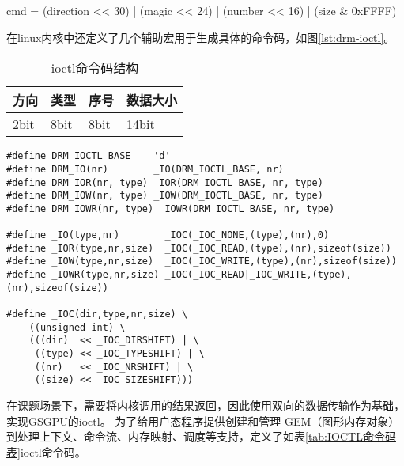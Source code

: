 cmd = (direction << 30) | (magic << 24) | (number << 16) | (size \& 0xFFFF)

在linux内核中还定义了几个辅助宏用于生成具体的命令码，如图\ref{lst:drm-ioctl}。

\begin{table}[h]
  \centering
  \caption{ioctl命令码结构}
  \label{tab:ioctl命令码结构}
  \begin{tabular}{llll}
    \toprule
    方向  & 类型 & 序号 & 数据大小 \\
    \midrule
    2bit & 8bit & 8bit & 14bit \\
    \bottomrule
  \end{tabular}
  \note{}
\end{table}


\begin{lstlisting}[caption={DRM IOCTL宏定义}, label={lst:drm-ioctl}]
#define DRM_IOCTL_BASE    'd'
#define DRM_IO(nr)        _IO(DRM_IOCTL_BASE, nr)
#define DRM_IOR(nr, type) _IOR(DRM_IOCTL_BASE, nr, type)
#define DRM_IOW(nr, type) _IOW(DRM_IOCTL_BASE, nr, type)
#define DRM_IOWR(nr, type) _IOWR(DRM_IOCTL_BASE, nr, type)

#define _IO(type,nr)        _IOC(_IOC_NONE,(type),(nr),0)
#define _IOR(type,nr,size)  _IOC(_IOC_READ,(type),(nr),sizeof(size))
#define _IOW(type,nr,size)  _IOC(_IOC_WRITE,(type),(nr),sizeof(size))
#define _IOWR(type,nr,size) _IOC(_IOC_READ|_IOC_WRITE,(type),(nr),sizeof(size))

#define _IOC(dir,type,nr,size) \
    ((unsigned int) \
    (((dir)  << _IOC_DIRSHIFT) | \
     ((type) << _IOC_TYPESHIFT) | \
     ((nr)   << _IOC_NRSHIFT) | \
     ((size) << _IOC_SIZESHIFT)))
\end{lstlisting}


在课题场景下，需要将内核调用的结果返回，因此使用双向的数据传输作为基础，实现GSGPU的ioctl。
为了给用户态程序提供创建和管理 GEM（图形内存对象）到处理上下文、命令流、内存映射、调度等支持，定义了如表\ref{tab:IOCTL命令码表}ioctl命令码。


